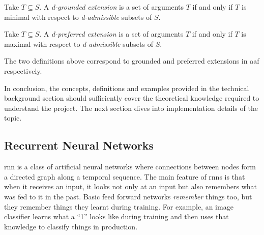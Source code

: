             
            \begin{definition}
                Take $T \subseteq S$. A \textit{d-grounded extension} is a set of arguments $T$ if and only if $T$ is minimal with respect to \textit{d-admissible} subsets of $S$. 
                \label{definition:definition23}
            \end{definition}
            
            \begin{definition}
                Take $T \subseteq S$. A \textit{d-preferred extension} is a set of arguments $T$ if and only if $T$ is maximal with respect to \textit{d-admissible} subsets of $S$. 
                \label{definition:definition24}
            \end{definition}
            
            The two definitions above correspond to grounded and preferred extensions in \gls{aaf} respectively.
            
            In conclusion, the concepts, definitions and examples provided in the technical background section should sufficiently cover the theoretical knowledge required to understand the project. The next section dives into implementation details of the topic.
            
    \subsection{Recurrent Neural Networks}
        \gls{rnn} is a class of artificial neural networks where connections between nodes form a directed graph along a temporal sequence. The main feature of \gls{rnn}s is that when it receives an input, it looks not only at an input but also remembers what was fed to it in the past. Basic feed forward networks \textit{remember} things too, but they remember things they learnt during training. For example, an image classifier learns what a “1” looks like during training and then uses that knowledge to classify things in production.


